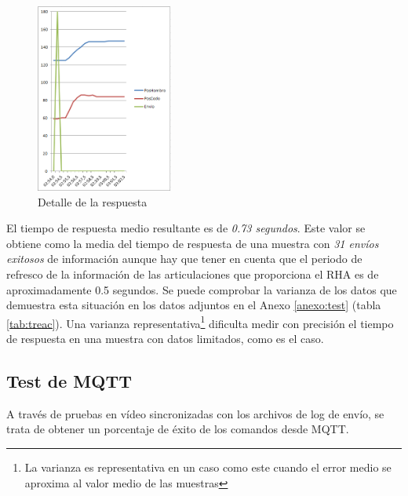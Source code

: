 \begin{figure}[tb]
\centering
\includegraphics[width=0.4\textwidth]{figuras/tresp.png}
\caption{Detalle de la respuesta}
\label{fig:tresp}
\end{figure}

El tiempo de respuesta medio resultante es de \textit{0.73 segundos}. Este valor se obtiene como la media del tiempo de respuesta de una muestra con \textit{31 envíos exitosos} de información aunque hay que tener en cuenta que el periodo de refresco de la información de las articulaciones que proporciona el RHA es de aproximadamente 0.5 segundos. Se puede comprobar la varianza de los datos que demuestra esta situación en los datos adjuntos en el Anexo \ref{anexo:test} (tabla \ref{tab:treac}). Una varianza representativa\footnote{La varianza es representativa en un caso como este cuando el error medio se aproxima al valor medio de las muestras} dificulta medir con precisión el tiempo de respuesta en una muestra con datos limitados, como es el caso.

\subsection{Test de MQTT}

A través de pruebas en vídeo sincronizadas con los archivos de log de envío, se trata de obtener un porcentaje de éxito de los comandos desde MQTT.

